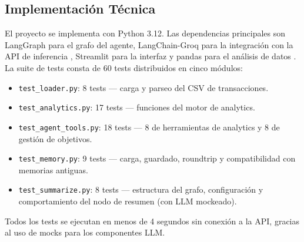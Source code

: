 \subsection{Implementación Técnica}
\label{subsec:implementacion_tecnica}

El proyecto se implementa con Python 3.12. Las dependencias principales son LangGraph \cite{langgraph2024} para el grafo del agente, LangChain-Groq para la integración con la API de inferencia \cite{groq2024}, Streamlit para la interfaz \cite{streamlit2021} y pandas para el análisis de datos \cite{pandas2020}. La suite de tests consta de 60 tests distribuidos en cinco módulos:

\begin{itemize}
    \item \texttt{test\_loader.py}: 8 tests --- carga y parseo del CSV de transacciones.
    \item \texttt{test\_analytics.py}: 17 tests --- funciones del motor de analytics.
    \item \texttt{test\_agent\_tools.py}: 18 tests --- 8 de herramientas de analytics y 8 de gestión de objetivos.
    \item \texttt{test\_memory.py}: 9 tests --- carga, guardado, roundtrip y compatibilidad con memorias antiguas.
    \item \texttt{test\_summarize.py}: 8 tests --- estructura del grafo, configuración y comportamiento del nodo de resumen (con LLM mockeado).
\end{itemize}

Todos los tests se ejecutan en menos de 4 segundos sin conexión a la API, gracias al uso de mocks para los componentes LLM.